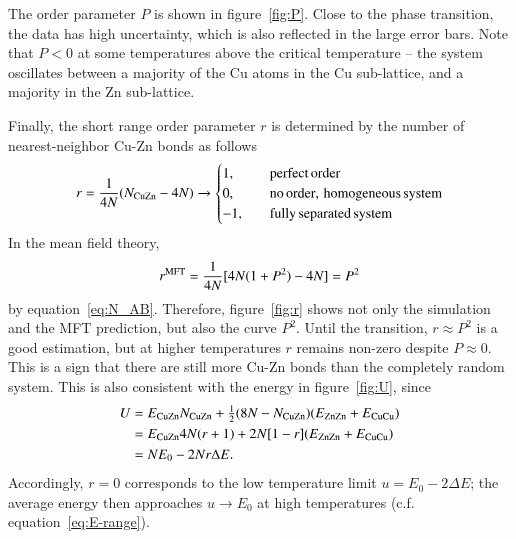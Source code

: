 The order parameter $P$ is shown in figure~\ref{fig:P}. Close to the phase transition, the data has high uncertainty, which is also reflected in the large error bars. Note that $P <0$ at some temperatures above the critical temperature -- the system oscillates between a majority of the Cu atoms in the Cu sub-lattice, and a majority in the Zn sub-lattice.  

Finally, the short range order parameter $r$ is determined by the number of nearest-neighbor Cu-Zn bonds as follows
\begin{equation}
r = \frac{1}{4 N}(N_{\rm CuZn}-4N) \rightarrow \begin{cases}
1, \quad& {\rm perfect \, order} \\
0, \quad&  {\rm no \, order, \, homogeneous \, system}\\
-1, \quad& {\rm fully \, separated \, system}
\end{cases}
\end{equation}
In the mean field theory, 
\begin{equation}
r^{\rm MFT} = \frac{1}{4 N}[4N(1+P^2)-4N] = P^2
\end{equation}
by equation~\eqref{eq:N_AB}. Therefore, figure~\ref{fig:r} shows not only the simulation and the MFT prediction, but also the curve $P^2$. Until the transition, $r \approx P^2$ is a good estimation, but at higher temperatures $r$ remains non-zero despite $P \approx 0$. This is a sign that there are still more Cu-Zn bonds than the completely random system. This is also consistent with the energy in figure~\ref{fig:U}, since 
\begin{align}
U &= E_{\rm CuZn}N_{\rm CuZn}
+ \tfrac{1}{2}(8N - N_{\rm CuZn}) ( E_{\rm ZnZn} + E_{\rm CuCu})
\\ &=
 E_{\rm CuZn}4N(r+1)
+ 2N [1 - r] ( E_{\rm ZnZn} + E_{\rm CuCu})  
\\ &=
N E_0   - 2N r \Delta E .
\end{align}
Accordingly, $r = 0$ corresponds to the low temperature limit $u = E_0 -2\Delta E$; the average energy then approaches $u \rightarrow E_0$ at high temperatures (c.f. equation~\eqref{eq:E-range}).   

